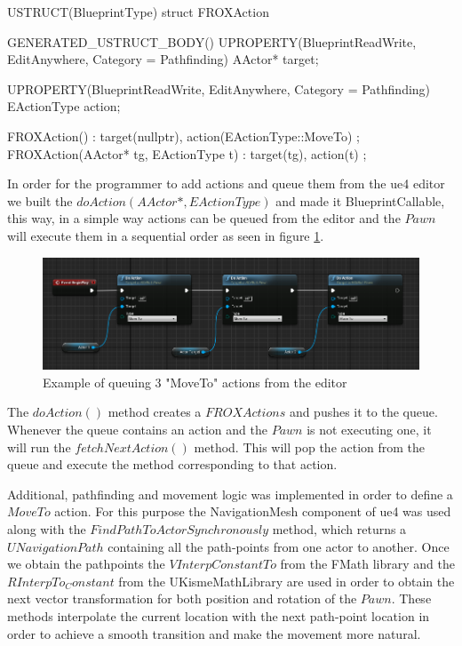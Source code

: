 \begin{listing}[language=C++, caption=FROXAction struct, frame=single, label=code:actionStruct]
	USTRUCT(BlueprintType)
	struct FROXAction
	{
		GENERATED_USTRUCT_BODY()
		UPROPERTY(BlueprintReadWrite, EditAnywhere, Category = Pathfinding)
		AActor* target;
		
		UPROPERTY(BlueprintReadWrite, EditAnywhere, Category = Pathfinding)
		EActionType action;
		
		FROXAction() : target(nullptr), action(EActionType::MoveTo) {};
		FROXAction(AActor* tg, EActionType t) : target(tg), action(t) {};
	}
\end{listing}

In order for the programmer to add actions and queue them from the \gls{ue4} editor we built the $doAction(AActor*, EActionType)$ and made it BlueprintCallable, this way, in a simple way actions can be queued from the editor and the $Pawn$ will execute them in a sequential order as seen in figure \ref{action_queue}.

\begin{figure}[h]
	\includegraphics[scale=0.4]{archivos/action_queue.png}
	\centering
	\caption{Example of queuing 3 "MoveTo" actions from the editor}
	\label{action_queue}
\end{figure}

The $doAction()$ method creates a $FROXActions$ and pushes it to the queue. Whenever the queue contains an action and the $Pawn$ is not executing one, it will run the $fetchNextAction()$ method. This will pop the action from the queue and execute the method corresponding to that action.


Additional, pathfinding and movement logic was implemented in order to define a $MoveTo$ action. For this purpose the NavigationMesh component of \gls{ue4} was used along with the $FindPathToActorSynchronously$ method, which returns a $UNavigationPath$ containing all the path-points from one actor to another. Once we obtain the pathpoints the $VInterpConstantTo$ from the FMath library and the $RInterpTo_Constant$ from the UKismeMathLibrary are used in order to obtain the next vector transformation for both position and rotation of the $Pawn$. These methods interpolate the current location with the next path-point location in order to achieve a smooth transition and make the movement more natural.